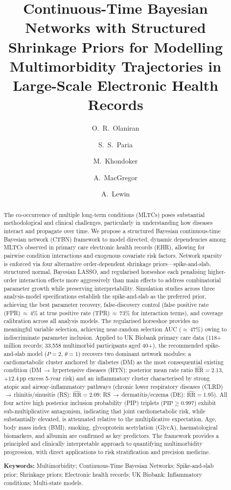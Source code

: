 \documentclass[12pt]{article}
\title{\textbf{Continuous-Time Bayesian Networks with Structured Shrinkage
Priors for Modelling Multimorbidity Trajectories in Large-Scale
Electronic Health Records}}
\author[1]{O.~R.~Olaniran}
\author[1]{S.~S.~Paria}
\author[2]{M.~Khondoker}
\author[2]{A.~MacGregor}
\author[1]{A.~Lewin}
\affil[1]{Department of Medical Statistics, London School of Hygiene \&
Tropical Medicine, London, UK}
\affil[2]{University of East Anglia, Norwich, UK}
\date{}
\begin{document}
\maketitle
\thispagestyle{empty}

\begin{abstract}

The co-occurrence of multiple long-term conditions (MLTCs) poses substantial methodological and clinical challenges, particularly in understanding how 
diseases interact and propagate over time. We propose a structured Bayesian continuous-time Bayesian network (CTBN) framework to model directed, dynamic dependencies among MLTCs observed in primary care electronic health records (EHR), allowing for pairwise condition interactions and exogenous covariate 
risk factors. Network sparsity is enforced via four alternative order-dependent shrinkage priors---spike-and-slab, structured normal, Bayesian LASSO, and 
regularised horseshoe each penalising higher-order interaction effects more aggressively than main effects to address combinatorial parameter growth while preserving interpretability. Simulation studies across three analysis-model specifications establish the spike-and-slab as the preferred prior, achieving the best parameter recovery, false-discovery control (false positive rate (FPR)\,$\approx$\,4\% at true positive rate (TPR)\,$\approx$\,73\% for interaction terms), and coverage calibration across all analysis models. The 
regularised horseshoe provides no meaningful variable selection, achieving near-random selection AUC ($\approx$\,47\%) owing to indiscriminate parameter 
inclusion. Applied to UK Biobank primary care data (118+ million records; 33,558 multimorbid participants aged 40+), the recommended spike-and-slab model ($P = 2$, $\theta = 1$) recovers two dominant network modules: a cardiometabolic cluster anchored by diabetes (DM) as the most consequential existing condition (DM\,$\to$\,hypertensive diseases (HTN): posterior mean rate ratio $\widehat{\text{RR}} = 2.13$, 
$+12.4$\,pp excess 5-year risk) and an inflammatory cluster characterised by strong atopic and airway-inflammatory pathways (chronic lower respiratory diseases (CLRD)\,$\to$\,rhinitis/sinusitis (RS): 
$\widehat{\text{RR}} = 2.09$; RS\,$\to$\,dermatitis/eczema (DE): $\widehat{\text{RR}} = 1.95$). All four active high posterior inclusion probability (PIP) triplets ($\text{PIP} \geq 0.997$) exhibit sub-multiplicative antagonism, indicating 
that joint cardiometabolic risk, while substantially elevated, is attenuated relative to the multiplicative expectation. Age, body mass index (BMI), smoking, glycoprotein acetylation (GlycA), haematological biomarkers, and albumin are confirmed as key predictors. The framework provides a principled and clinically interpretable approach to quantifying multimorbidity progression, with direct applications to risk stratification and precision medicine.

\smallskip
\noindent\textbf{Keywords:} Multimorbidity; Continuous-Time Bayesian Networks;
Spike-and-slab prior; Shrinkage priors; Electronic health records; UK Biobank;
Inflammatory conditions; Multi-state models.
\end{abstract}
\end{document}
